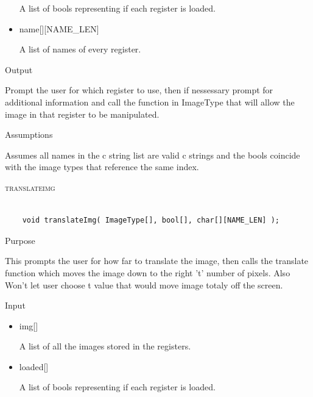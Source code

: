 \documentclass[pdftex, 11pt]{article}
\begin{document}
\begin{description}
\begin{description}
\begin{itemize}
						A list of bools representing if each register is loaded.

					\item{name[][NAME\_LEN]}

						A list of names of every register.

				\end{itemize}

			\item{Output}

				Prompt the user for which register to use, then if nessessary
				prompt for additional information and call the function
				in ImageType that will allow the image in that register to
				be manipulated.

			\item{Assumptions}

				Assumes all names in the c string list are valid c
				strings and the bools coincide with the image types that
				reference the same index.

		\end{description}



	\item{\textsc{translateimg}}

		\begin{lstlisting}

	void translateImg( ImageType[], bool[], char[][NAME_LEN] );
		\end{lstlisting}

		\begin{description}
			\item{Purpose}
			
				This prompts the user for how far to translate the image, then calls the
				translate function which moves the image down to the right 't' number of
				pixels.  Also Won't let user choose t value that would move image totaly off
				the screen.

			\item{Input}

				\begin{itemize}

					\item{img[]}

						A list of all the images stored in the registers.

					\item{loaded[]}

						A list of bools representing if each register is loaded.


\end{itemize}
\end{description}
\end{description}
\end{document}
